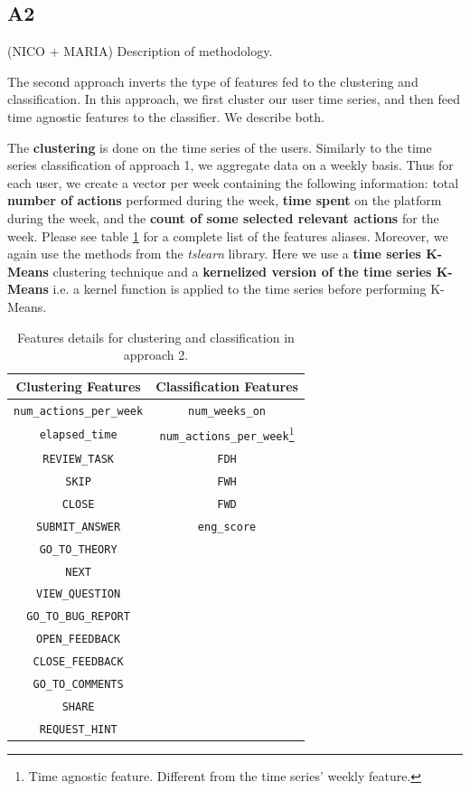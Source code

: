 \documentclass[sigplan,screen]{acmart}
\begin{document}
\subsection{A2}\label{subsec:A2}
{\color{red}(NICO + MARIA) Description of methodology.}     

The second approach inverts the type of features fed to the clustering and classification. In this approach, we first cluster our user time series, and then feed time agnostic features to the classifier. We describe both.

The \textbf{clustering} is done on the time series of the users. Similarly to the time series classification of approach 1, we aggregate data on a weekly basis. Thus for each user, we create a vector per week containing the following information: total \textbf{number of actions} performed during the week, \textbf{time spent} on the platform during the week, and the \textbf{count of some selected relevant actions} for the week. Please see table \ref{tab:A2_feature_vectors} for a complete list of the features aliases. Moreover, we again use the methods from the  \emph{tslearn}\cite{tslearn} library. Here we use a \textbf{time series K-Means} clustering technique and a \textbf{kernelized version of the time series K-Means} i.e. a kernel function is applied to the time series before performing K-Means.

\begin{table}[h]
    \centering
    \begin{tabular}{|c|c|}
    \hline
        Clustering Features & Classification Features \\ \hline
        \texttt{num\_actions\_per\_week} & \texttt{num\_weeks\_on}\\ 
        \texttt{elapsed\_time} & \texttt{num\_actions\_per\_week}\footnote{Time agnostic feature. Different from the time series' weekly feature.}\\
        \texttt{REVIEW\_TASK} & \texttt{FDH}\\ 
        \texttt{SKIP} & \texttt{FWH} \\ 
        \texttt{CLOSE} & \texttt{FWD} \\ 
        \texttt{SUBMIT\_ANSWER} & \texttt{eng\_score}\\ 
        \texttt{GO\_TO\_THEORY} & \\ 
        \texttt{NEXT} & \\ 
        \texttt{VIEW\_QUESTION} & \\ 
        \texttt{GO\_TO\_BUG\_REPORT} & \\ 
        \texttt{OPEN\_FEEDBACK} & \\ 
        \texttt{CLOSE\_FEEDBACK} & \\ 
        \texttt{GO\_TO\_COMMENTS} & \\ 
        \texttt{SHARE} & \\ 
        \texttt{REQUEST\_HINT} & \\ \hline
    \end{tabular}
    \caption{Features details for clustering and classification in approach 2.}
    \label{tab:A2_feature_vectors}
\end{table}
\end{document}
